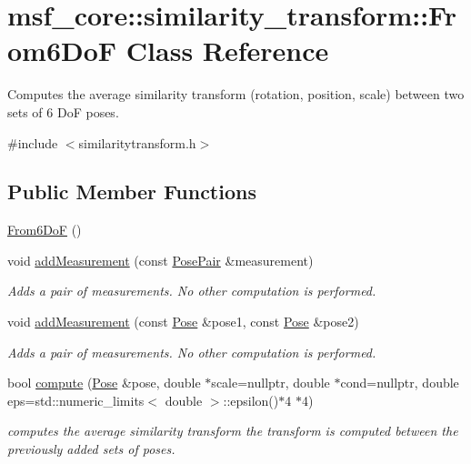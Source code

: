 \hypertarget{classmsf__core_1_1similarity__transform_1_1From6DoF}{\section{msf\-\_\-core\-:\-:similarity\-\_\-transform\-:\-:From6\-Do\-F Class Reference}
\label{classmsf__core_1_1similarity__transform_1_1From6DoF}
}


Computes the average similarity transform (rotation, position, scale) between two sets of 6 Do\-F poses.  




{\ttfamily \#include $<$similaritytransform.\-h$>$}

\subsection*{Public Member Functions}
\begin{DoxyCompactItemize}
\item 
\hyperlink{classmsf__core_1_1similarity__transform_1_1From6DoF_a984951e002da11503c88e88927450d0b}{From6\-Do\-F} ()
\item 
void \hyperlink{classmsf__core_1_1similarity__transform_1_1From6DoF_a842474c8de6308fd9805f96eb8069954}{add\-Measurement} (const \hyperlink{namespacemsf__core_1_1similarity__transform_aaf333aba3d1f81a96f7294f05f311590}{Pose\-Pair} \&measurement)
\begin{DoxyCompactList}\small\item\em Adds a pair of measurements. No other computation is performed. \end{DoxyCompactList}\item 
void \hyperlink{classmsf__core_1_1similarity__transform_1_1From6DoF_ac03ed87bcf4b8a7dc9aefb0ec22f5f17}{add\-Measurement} (const \hyperlink{namespacemsf__core_1_1similarity__transform_a7ecde3e7b02bda457b404fc49b03179f}{Pose} \&pose1, const \hyperlink{namespacemsf__core_1_1similarity__transform_a7ecde3e7b02bda457b404fc49b03179f}{Pose} \&pose2)
\begin{DoxyCompactList}\small\item\em Adds a pair of measurements. No other computation is performed. \end{DoxyCompactList}\item 
bool \hyperlink{classmsf__core_1_1similarity__transform_1_1From6DoF_ae5e680668d31c2b4522bbf1a3aafdfb1}{compute} (\hyperlink{namespacemsf__core_1_1similarity__transform_a7ecde3e7b02bda457b404fc49b03179f}{Pose} \&pose, double $\ast$scale=nullptr, double $\ast$cond=nullptr, double eps=std\-::numeric\-\_\-limits$<$ double $>$\-::epsilon()$\ast$4 $\ast$4)
\begin{DoxyCompactList}\small\item\em computes the average similarity transform the transform is computed between the previously added sets of poses. \end{DoxyCompactList}\end{DoxyCompactItemize}
